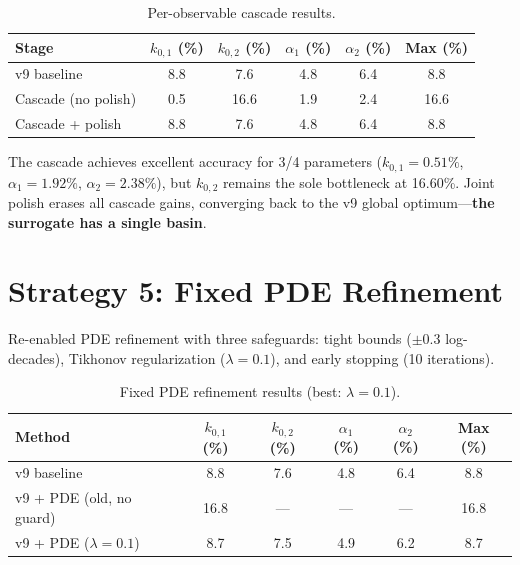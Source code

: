 \documentclass[11pt]{article}
\begin{document}
\begin{table}[htbp]
  \centering
  \caption{Per-observable cascade results.}
  \label{tab:cascade}
  \begin{tabular}{l S[round-precision=1] S[round-precision=1]
                    S[round-precision=1] S[round-precision=1]
                    S[round-precision=1]}
    \toprule
    Stage & {$k_{0,1}$ (\%)} & {$k_{0,2}$ (\%)}
          & {$\alpha_1$ (\%)} & {$\alpha_2$ (\%)}
          & {Max (\%)} \\
    \midrule
    v9 baseline         &  8.8 &  7.6 &  4.8 &  6.4 &  8.8 \\
    Cascade (no polish) &  0.5 & 16.6 &  1.9 &  2.4 & 16.6 \\
    Cascade + polish    &  8.8 &  7.6 &  4.8 &  6.4 &  8.8 \\
    \bottomrule
  \end{tabular}
\end{table}

The cascade achieves excellent accuracy for 3/4 parameters ($k_{0,1} = 0.51\%$,
$\alpha_1 = 1.92\%$, $\alpha_2 = 2.38\%$), but $k_{0,2}$ remains the sole
bottleneck at 16.60\%.  Joint polish erases all cascade gains, converging back
to the v9 global optimum---\textbf{the surrogate has a single basin}.


\section{Strategy 5: Fixed PDE Refinement}

Re-enabled PDE refinement with three safeguards: tight bounds ($\pm 0.3$
log-decades), Tikhonov regularization ($\lambda = 0.1$), and early stopping
(10 iterations).

\begin{table}[htbp]
  \centering
  \caption{Fixed PDE refinement results (best: $\lambda = 0.1$).}
  \label{tab:pde_fixed}
  \begin{tabular}{l S[round-precision=1] S[round-precision=1]
                    S[round-precision=1] S[round-precision=1]
                    S[round-precision=1]}
    \toprule
    Method & {$k_{0,1}$ (\%)} & {$k_{0,2}$ (\%)}
           & {$\alpha_1$ (\%)} & {$\alpha_2$ (\%)}
           & {Max (\%)} \\
    \midrule
    v9 baseline                &  8.8 &  7.6 &  4.8 &  6.4 &  8.8 \\
    v9 + PDE (old, no guard)   & 16.8 & {---} & {---} & {---} & 16.8 \\
    v9 + PDE ($\lambda = 0.1$) &  8.7 &  7.5 &  4.9 &  6.2 &  8.7 \\
    \bottomrule
  \end{tabular}
\end{table}
\end{document}
